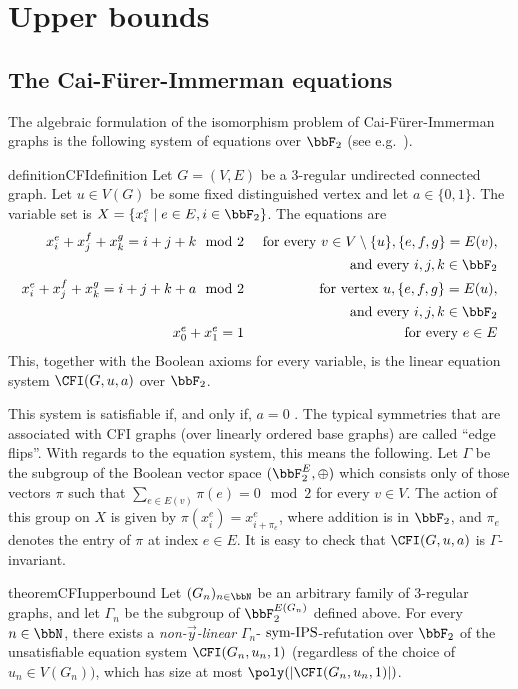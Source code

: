 \documentclass[a4paper,UKenglish,cleveref, autoref, thm-restate]{lipics-v2021}
\newcommand{\symIPS}{\text{ \upshape sym-IPS}}
\begin{document}
\section{Upper bounds}

\subsection{The Cai-Fürer-Immerman equations}
\label{sec:CFI}



The algebraic formulation of the isomorphism problem of Cai-Fürer-Immerman graphs is the following system of equations over $\bbF_2$ (see e.g.\ \cite{atseriasBulatovDawar}).
\begin{restatable}{definition}{CFIdefinition}
	\label{def:CFI}
	Let $G = (V,E)$ be a 3-regular undirected connected graph. Let $u \in V(G)$ be some fixed distinguished vertex and let $a \in \{0,1\}$. 
	The variable set is $X = \{x^e_i \mid e \in E, i \in \bbF_2\}$. The equations are
	\begin{align*}
		x_i^{e} + x_j^{f}  + x_k^{g} = i+j+k \mod 2  & & \text{      for every } v \in V \setminus \{u\}, \{e,f,g\} = E(v),\\
		&  & \text{ and every } i,j,k \in \bbF_2\\
		x_i^{e} + x_j^{f}  + x_k^{g} = i+j+k+a \mod 2 & & \text{ for vertex } u, \{e,f,g\} = E(u),\\
		&  & \text{ and every } i,j,k \in \bbF_2\\
		x_0^{e} + x_1^{e} = 1 & & \text{ for every } e \in E
	\end{align*}	
	This, together with the Boolean axioms for every variable, is the linear equation system $\CFI(G, u, a)$ over $\bbF_2$.
\end{restatable}
This system is satisfiable if, and only if, $a = 0$ \cite{atseriasBulatovDawar}. 
The typical symmetries that are associated with CFI graphs (over linearly ordered base graphs) are called ``edge flips''. With regards to the equation system, this means the following. Let $\Gamma$ be the subgroup of the Boolean vector space $(\bbF_2^{E}, \oplus)$ which consists only of those vectors $\pi$ such that $\sum_{e \in E(v)} \pi(e) = 0 \mod 2$ for every $v \in V$. 
The action of this group on $X$ is given by $\pi(x^e_i) = x^e_{i+\pi_e}$, where addition is in $\bbF_2$, and $\pi_e$ denotes the entry of $\pi$ at index $e \in E$. It is easy to check that $\CFI(G, u, a)$ is $\Gamma$-invariant. 
\begin{restatable}{theorem}{CFIupperbound}
	\label{thm:symmetricF2RefutationCFI}
	Let $(G_n)_{n \in \bbN}$ be an arbitrary family of $3$-regular graphs, and let $\Gamma_n$ be the subgroup of $\bbF_2^{E(G_n)}$ defined above.
	For every $n \in \bbN$, there exists a \emph{non-$\vec{y}$-linear} $\Gamma_n$-$\symIPS$-refutation over $\bbF_2$ of the unsatisfiable equation system $\CFI(G_n, u_n, 1)$ (regardless of the choice of $u_n \in V(G_n))$, which has size at most $\poly(|\CFI(G_n, u_n, 1)|)$. 
\end{restatable}	
\end{document}
